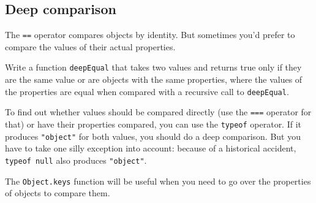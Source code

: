 \label{data.exercise_deep_compare}\subsection{Deep comparison}

The \lstinline`==` operator compares objects by identity. But sometimes you'd prefer to compare the values of their actual properties.

Write a function \lstinline`deepEqual` that takes two values and returns true only if they are the same value or are objects with the same properties, where the values of the properties are equal when compared with a recursive call to \lstinline`deepEqual`.

To find out whether values should be compared directly (use the \lstinline`===` operator for that) or have their properties compared, you can use the \lstinline`typeof` operator. If it produces \lstinline`"object"` for both values, you should do a deep comparison. But you have to take one silly exception into account: because of a historical accident, \lstinline`typeof null` also produces \lstinline`"object"`.

The \lstinline`Object.keys` function will be useful when you need to go over the properties of objects to compare them.
